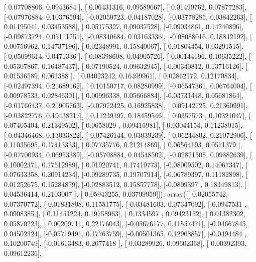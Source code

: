 \documentclass{article}
\begin{document}
       [ 0.07708866,  0.0943684 ],
       [ 0.06431316,  0.09589667],
       [ 0.01499762,  0.07877283],
       [-0.07976884,  0.10376594],
       [-0.02050723,  0.04187028],
       [-0.03778285,  0.03842263],
       [ 0.01195041,  0.03453588],
       [ 0.05175327,  0.09037528],
       [-0.09034861,  0.14240896],
       [-0.09873724,  0.05111251],
       [-0.08340684,  0.03163336],
       [-0.08088016,  0.18842192],
       [ 0.00756962,  0.14737196],
       [-0.02348991,  0.15840067],
       [ 0.01804454,  0.03291515],
       [-0.05099614,  0.0471336 ],
       [-0.08398608,  0.04905726],
       [-0.00144196,  0.10635222],
       [ 0.05307867,  0.16487437],
       [ 0.07190524,  0.09632945],
       [-0.00340812,  0.13716126],
       [ 0.01536589,  0.061388  ],
       [ 0.04023242,  0.16499961],
       [ 0.02862172,  0.12170834],
       [-0.02497394,  0.21689162],
       [ 0.10150717,  0.08280999],
       [-0.06547361,  0.06764004],
       [ 0.00978533,  0.02846301],
       [ 0.00996338,  0.05666884],
       [-0.03731448,  0.05681864],
       [-0.01766437,  0.21905763],
       [-0.07972425,  0.16925838],
       [ 0.09142725,  0.21360991],
       [-0.03822776,  0.19438217],
       [ 0.11239197,  0.18459546],
       [ 0.0357573 ,  0.10321047],
       [ 0.07405404,  0.21349502],
       [-0.0658029 ,  0.09416981],
       [ 0.03044154,  0.11238015],
       [-0.04346468,  0.13033822],
       [-0.07426144,  0.03039239],
       [-0.06244802,  0.21072906],
       [ 0.11035695,  0.17413333],
       [ 0.07735776,  0.21214869],
       [ 0.06564193,  0.0571379 ],
       [-0.07700934,  0.06953389],
       [-0.05708884,  0.04548502],
       [-0.02821505,  0.09882639],
       [ 0.10002371,  0.17512989],
       [ 0.01920741,  0.17419773],
       [-0.08009502,  0.14067347],
       [ 0.07633358,  0.20914234],
       [-0.09289735,  0.19707914],
       [-0.06789397,  0.11182898],
       [ 0.01252675,  0.15284879],
       [-0.02883512,  0.15857778],
       [-0.0809397 ,  0.18349813],
       [ 0.04536414,  0.2103007 ],
       [ 0.05943255,  0.03799959]]), array([[ 0.02055742,  0.07370772],
       [ 0.01831808,  0.11551775],
       [-0.03481603,  0.07347092],
       [ 0.0947531 ,  0.0908385 ],
       [ 0.11451224,  0.19758963],
       [ 0.1334597 ,  0.09423152],
       [ 0.01382302,  0.05870223],
       [ 0.00209711,  0.22176043],
       [-0.05676177,  0.11557471],
       [-0.04667845,  0.04502324],
       [-0.05719491,  0.17763759],
       [-0.00501365,  0.12908857],
       [-0.0494484 ,  0.10200749],
       [-0.01613483,  0.2077418 ],
       [ 0.03289926,  0.09602368],
       [ 0.00392393,  0.09612236],
\end{document}
